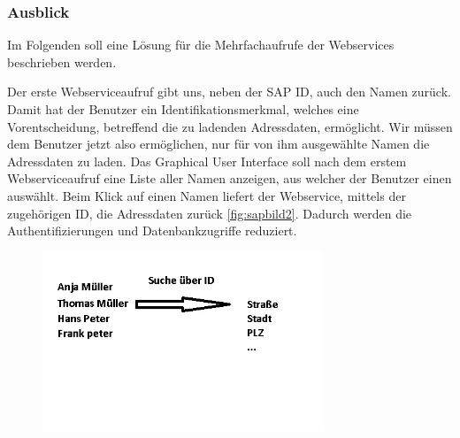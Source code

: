 \FloatBarrier
\subsubsection{Ausblick}

Im Folgenden soll eine Lösung für die Mehrfachaufrufe der Webservices beschrieben werden.

Der erste Webserviceaufruf gibt uns, neben der SAP ID, auch den Namen zurück. Damit hat der Benutzer ein Identifikationsmerkmal, 
welches eine Vorentscheidung, betreffend die zu ladenden Adressdaten, ermöglicht. Wir müssen dem Benutzer jetzt also ermöglichen, nur für 
von ihm ausgewählte Namen die Adressdaten zu laden. Das Graphical User Interface soll nach dem erstem Webserviceaufruf eine 
Liste aller Namen anzeigen, aus welcher der Benutzer einen auswählt. Beim Klick auf einen Namen liefert der Webservice, 
mittels der zugehörigen ID, die Adressdaten zurück \ref{fig:sapbild2}. Dadurch werden die Authentifizierungen und Datenbankzugriffe reduziert.

\begin{figure}[h!t]
\begin{center}
\includegraphics[width=0.75\textwidth]{Bilder/presi2.jpg}
\end{center}
\caption{}
\label{Einfacher WSDL Aufruf}
\end{figure}
\FloatBarrier